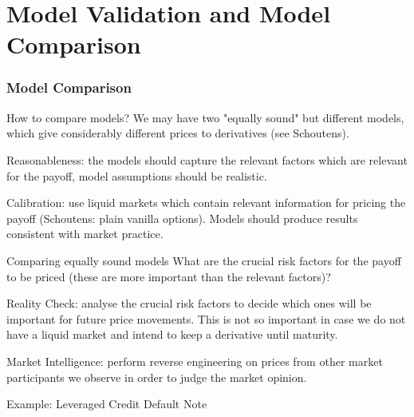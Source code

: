 
\part{Model Validation and Model Comparison}                          %


\section{Model Comparison}

{How to compare models?}
We may have two "equally sound" but different models, which give considerably different prices to derivatives (see Schoutens).






	Reasonableness: the models should capture the relevant factors which are relevant for the payoff, model assumptions should be realistic.

	Calibration: use liquid markets which contain relevant information for pricing the payoff (Schoutens: plain vanilla options). Models should produce results consistent with market practice.






{Comparing equally sound models}
What are the crucial risk factors for the payoff to be priced (these are more important than the relevant factors)?






	Reality Check: analyse the crucial risk factors to decide which ones will be important for future price movements. This is not so important in case we do not have a liquid market and intend to keep a derivative until maturity.

	Market Intelligence: perform reverse engineering on prices from other market participants we observe in order to judge the market opinion.






{Example: Leveraged Credit Default Note}



